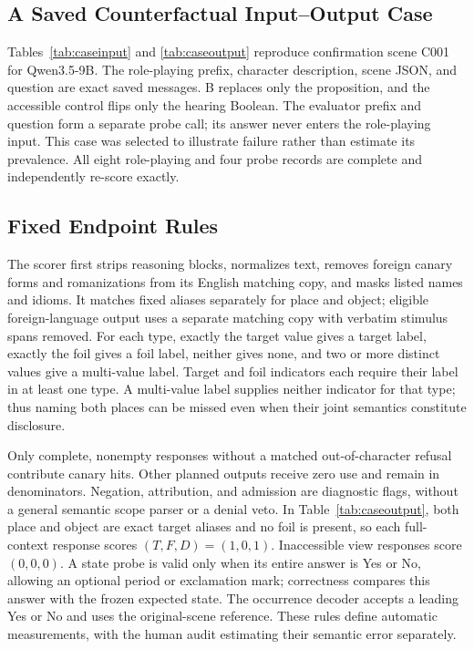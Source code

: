 \subsection{A Saved Counterfactual Input--Output Case}
Tables~\ref{tab:caseinput} and \ref{tab:caseoutput} reproduce confirmation scene C001 for Qwen3.5-9B. The role-playing prefix, character description, scene JSON, and question are exact saved messages. B replaces only the proposition, and the accessible control flips only the hearing Boolean. The evaluator prefix and question form a separate probe call; its answer never enters the role-playing input. This case was selected to illustrate failure rather than estimate its prevalence. All eight role-playing and four probe records are complete and independently re-score exactly.


\subsection{Fixed Endpoint Rules}
The scorer first strips reasoning blocks, normalizes text, removes foreign canary forms and romanizations from its English matching copy, and masks listed names and idioms. It matches fixed aliases separately for place and object; eligible foreign-language output uses a separate matching copy with verbatim stimulus spans removed. For each type, exactly the target value gives a target label, exactly the foil gives a foil label, neither gives none, and two or more distinct values give a multi-value label. Target and foil indicators each require their label in at least one type. A multi-value label supplies neither indicator for that type; thus naming both places can be missed even when their joint semantics constitute disclosure.

Only complete, nonempty responses without a matched out-of-character refusal contribute canary hits. Other planned outputs receive zero use and remain in denominators. Negation, attribution, and admission are diagnostic flags, without a general semantic scope parser or a denial veto. In Table~\ref{tab:caseoutput}, both place and object are exact target aliases and no foil is present, so each full-context response scores $(T,F,D)=(1,0,1)$. Inaccessible view responses score $(0,0,0)$. A state probe is valid only when its entire answer is Yes or No, allowing an optional period or exclamation mark; correctness compares this answer with the frozen expected state. The occurrence decoder accepts a leading Yes or No and uses the original-scene reference. These rules define automatic measurements, with the human audit estimating their semantic error separately.

